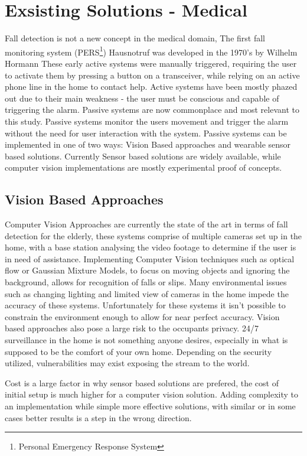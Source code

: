 \section{Exsisting Solutions - Medical}
Fall detection is not a new concept in the medical domain, The first fall monitoring system (PERS\footnote{Personal Emergency Response System}) Hausnotruf  was developed in the 1970’s by Wilhelm Hormann  These early active systems were manually triggered, requiring the user to activate them by pressing a button on a transceiver, while relying on an active phone line in the home to contact help. Active systems have been mostly phazed out due to their main weakness - the user must be conscious and capable of triggering the alarm. Passive systems are now commonplace and most relevant to this study. Passive systems monitor the users movement and trigger the alarm without the need for user interaction with the system. Passive systems can be implemented in one of two ways: Vision Based approaches and wearable sensor based solutions. Currently Sensor based solutions are widely available, while computer vision implementations are mostly experimental proof of concepts.  


\subsection{Vision Based Approaches}
Computer Vision Approaches are currently the state of the art in terms of fall detection for the elderly, these systems comprise of multiple cameras set up in the home, with a base station analysing the video footage to determine if the user is in need of assistance. Implementing Computer Vision techniques such as optical flow or Gaussian Mixture Models, to focus on moving objects and ignoring the background, allows for recognition of falls or slips. Many environmental issues such as changing lighting and limited view of cameras in the home impede the accuracy of these systems. Unfortunately for these systems it isn't possible to constrain the environment enough to allow for near perfect accuracy.
Vision based approaches also pose a large risk to the occupants privacy. 24/7 surveillance in the home is not something anyone desires, especially in what is supposed to be the comfort of your own home. Depending on the security utilized, vulnerabilities may exist exposing the stream to the world.

Cost is a large factor in why sensor based solutions are prefered, the cost of initial setup is much higher for a computer vision solution. Adding complexity to an implementation while simple more effective solutions, with similar or in some cases better results is a step in the wrong direction.



